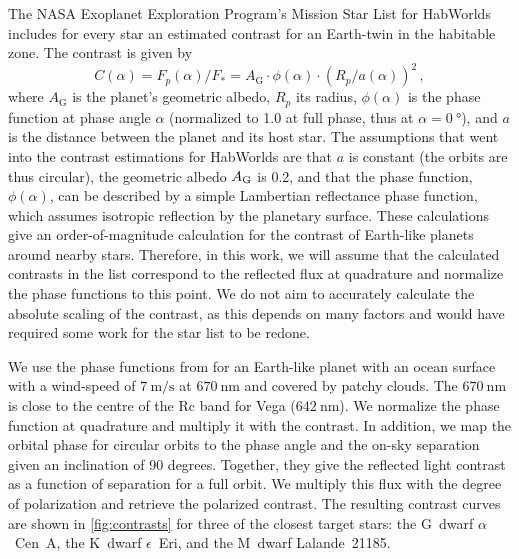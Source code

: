 \documentclass[usenatbib]{mnras}
\newcommand{\HWO}{HabWorlds\xspace}
\begin{document}
The NASA Exoplanet Exploration Program’s Mission Star List for \HWO includes for every star an estimated contrast for an Earth-twin in the habitable zone.
The contrast is given by \citep[see, e.g.,][]{2023A&A...671A.165M}
\begin{equation}
    C(\alpha) 
    = F_p(\alpha) / F_* 
    = A_\mathrm{G} \cdot \phi(\alpha) \cdot \left( R_p / a(\alpha) \right)^2 \,,
    \label{eq:contrast}
\end{equation}
where $A_\mathrm{G}$ is the planet's geometric albedo, $R_p$ its radius, $\phi(\alpha)$ is the phase function at phase angle $\alpha$ (normalized to \num{1.0} at full phase, thus at $\alpha=\qty{0}{\degree}$), and $a$ is the distance between the planet and its host star.
The assumptions that went into the contrast estimations for \HWO are that $a$ is constant (the orbits are thus circular), the geometric albedo $A_{\rm G}$ is \num{0.2}, and that the phase function, $\phi(\alpha)$, can be described by a simple Lambertian reflectance phase function, which assumes isotropic reflection by the planetary surface.
These calculations give an order-of-magnitude calculation for the contrast of Earth-like planets around nearby stars.
Therefore, in this work, we will assume that the calculated contrasts in the list correspond to the reflected flux at quadrature and normalize the phase functions to this point.
We do not aim to accurately calculate the absolute scaling of the contrast, as this depends on many factors and would have required some work for the star list to be redone.

We use the phase functions from \citet{treesandstam2019} for an Earth-like planet with an ocean surface with a wind-speed of $\qty{7}{\meter\per\second}$ at $\qty{670}{\nano\meter}$ and covered by patchy clouds.
The $\qty{670}{\nano\meter}$ is close to the centre of the Rc band for Vega ($\qty{642}{\nano\meter}$). 
We normalize the phase function at quadrature and multiply it with the contrast.
In addition, we map the orbital phase for circular orbits to the phase angle and the on-sky separation given an inclination of \num{90} degrees.
Together, they give the reflected light contrast as a function of separation for a full orbit.
We multiply this flux with the degree of polarization and retrieve the polarized contrast.
The resulting contrast curves are shown in \cref{fig:contrasts} for three of the closest target stars: the G~dwarf $\alpha$~Cen~A, the K~dwarf $\epsilon$~Eri, and the M~dwarf Lalande~21185.
\end{document}
